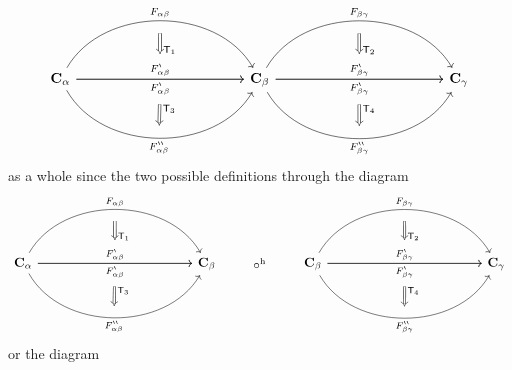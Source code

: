 \[
\begin{tikzcd}[row sep=huge, column sep=6em]
  \mathbf{C}_{\alpha}
  \arrow[bend left=60]{rr}[name=fab]{F_{\alpha\beta}}
  \arrow[swap]{rr}[name=fab*1]{F_{\alpha\beta}^{\backprime}}
  \arrow{rr}[name=fab*2]{F_{\alpha\beta}^{\backprime}}
  \arrow[bend right=60,swap]{rr}[name=fab**]{F_{\alpha\beta}^{\backprime\backprime}}
  &
  &
  \mathbf{C}_{\beta}
  \arrow[bend left=60]{rr}[name=fbc]{F_{\beta\gamma}}
  \arrow[swap]{rr}[name=fbc*1]{F_{\beta\gamma}^{\backprime}}
  \arrow{rr}[name=fbc*2]{F_{\beta\gamma}^{\backprime}}
  \arrow[bend right=60,swap]{rr}[name=fbc**]{F_{\beta\gamma}^{\backprime\backprime}}
  &
  &
  \mathbf{C}_{\gamma}
  \arrow[from=fab,to=fab*1,shorten <= 9pt,shorten >= 18pt,Rightarrow]{d}{\mathsf{T}_{1}}
  \arrow[from=fab*2,to=fab**,shorten <= 18pt,shorten >= 9pt,Rightarrow]{d}{\mathsf{T}_{3}}
  \arrow[from=fbc,to=fbc*1,shorten <= 9pt,shorten >= 18pt,Rightarrow]{d}{\mathsf{T}_{2}}
  \arrow[from=fbc*2,to=fbc**,shorten <= 18pt,shorten >= 9pt,Rightarrow]{d}{\mathsf{T}_{4}}
\end{tikzcd}
\]
as a whole since the two possible definitions through the diagram
\[
\begin{tikzcd}[row sep=huge, column sep=6em]
  \mathbf{C}_{\alpha}
  \arrow[bend left=60]{rr}[name=fab]{F_{\alpha\beta}}
  \arrow[swap]{rr}[name=fab*1]{F_{\alpha\beta}^{\backprime}}
  \arrow{rr}[name=fab*2]{F_{\alpha\beta}^{\backprime}}
  \arrow[bend right=60,swap]{rr}[name=fab**]{F_{\alpha\beta}^{\backprime\backprime}}
  &
  &
  \mathbf{C}_{\beta}
  \arrow[phantom]{r}{\circ^{\textrm{h}}}
  &
  \mathbf{C}_{\beta}
  \arrow[bend left=60]{rr}[name=fbc]{F_{\beta\gamma}}
  \arrow[swap]{rr}[name=fbc*1]{F_{\beta\gamma}^{\backprime}}
  \arrow{rr}[name=fbc*2]{F_{\beta\gamma}^{\backprime}}
  \arrow[bend right=60,swap]{rr}[name=fbc**]{F_{\beta\gamma}^{\backprime\backprime}}
  &
  &
  \mathbf{C}_{\gamma}
  \arrow[from=fab,to=fab*1,shorten <= 9pt,shorten >= 18pt,Rightarrow]{d}{\mathsf{T}_{1}}
  \arrow[from=fab*2,to=fab**,shorten <= 18pt,shorten >= 9pt,Rightarrow]{d}{\mathsf{T}_{3}}
  \arrow[from=fbc,to=fbc*1,shorten <= 9pt,shorten >= 18pt,Rightarrow]{d}{\mathsf{T}_{2}}
  \arrow[from=fbc*2,to=fbc**,shorten <= 18pt,shorten >= 9pt,Rightarrow]{d}{\mathsf{T}_{4}}
\end{tikzcd}
\]
or the diagram
